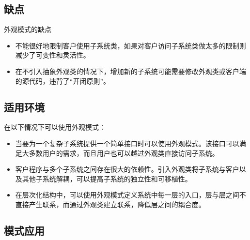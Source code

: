 \documentclass[letterpaper,10pt,english]{sphinxmanual}
\begin{document}
\subsection{缺点}
\label{\detokenize{structural_patterns/facade:id11}}
\sphinxAtStartPar
外观模式的缺点
\begin{itemize}
\item {} 
\sphinxAtStartPar
不能很好地限制客户使用子系统类，如果对客户访问子系统类做太多的限制则减少了可变性和灵活性。

\item {} 
\sphinxAtStartPar
在不引入抽象外观类的情况下，增加新的子系统可能需要修改外观类或客户端的源代码，违背了“开闭原则”。

\end{itemize}


\subsection{适用环境}
\label{\detokenize{structural_patterns/facade:id12}}
\sphinxAtStartPar
在以下情况下可以使用外观模式：
\begin{itemize}
\item {} 
\sphinxAtStartPar
当要为一个复杂子系统提供一个简单接口时可以使用外观模式。该接口可以满足大多数用户的需求，而且用户也可以越过外观类直接访问子系统。

\item {} 
\sphinxAtStartPar
客户程序与多个子系统之间存在很大的依赖性。引入外观类将子系统与客户以及其他子系统解耦，可以提高子系统的独立性和可移植性。

\item {} 
\sphinxAtStartPar
在层次化结构中，可以使用外观模式定义系统中每一层的入口，层与层之间不直接产生联系，而通过外观类建立联系，降低层之间的耦合度。

\end{itemize}


\subsection{模式应用}
\label{\detokenize{structural_patterns/facade:id13}}
\end{document}
